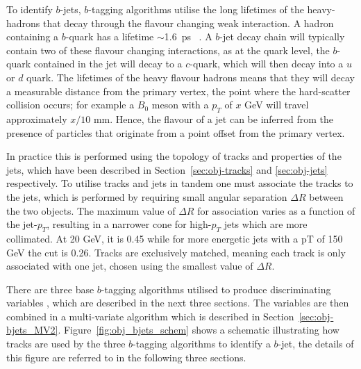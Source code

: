 To identify $b$-jets, $b$-tagging algorithms utilise the long lifetimes of the heavy-hadrons that decay through the flavour changing weak interaction.
A hadron containing a $b$-quark has a lifetime $\sim$\SI{1.6}{\pico\second} ~\cite{obj-bjets_PDG}.
A $b$-jet decay chain  will typically contain two of these flavour changing interactions, 
as at the quark level, the $b$-quark contained in the jet will decay to a $c$-quark, which will then decay into a $u$ or $d$ quark.
The lifetimes of the heavy flavour hadrons means that they will decay a measurable distance from the 
primary vertex, the point where the hard-scatter collision occurs;
for example a $B_0$ meson with a $p_T$ of $x$ GeV will travel approximately $x/10$ mm.
Hence, the flavour of a jet can be inferred from the presence of particles
that originate from a point offset from the primary vertex.

In practice this is performed using the topology of tracks and properties of the jets,
which have been described in Section~\ref{sec:obj-tracks} and \ref{sec:obj-jets} respectively.
To utilise tracks and jets in tandem one must associate the tracks to the jets,
which is performed by requiring small angular separation $\Delta R$ between the two objects.
The maximum value of $\Delta R$ for association varies as a function of the jet-$p_T$,
resulting in a narrower cone for high-$p_T$ jets which are more collimated.
At 20 GeV, it is 0.45 while for more energetic jets with a pT of 150 GeV the cut is 0.26.
Tracks are exclusively matched, meaning each track is only associated with one jet, chosen using the smallest value of $\Delta R$.

There are three base $b$-tagging algorithms utilised to produce discriminating variables \cite{obj-bjets_algo_2016}, which are described in the next three sections.
The variables are then combined in a multi-variate algorithm which is described in Section~\ref{sec:obj-bjets_MV2}.
Figure~\ref{fig:obj_bjets_schem} shows a schematic illustrating how tracks
are used by the three $b$-tagging algorithms to identify a $b$-jet,
the details of this figure are referred to in the following three sections.

